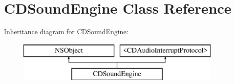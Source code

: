 \hypertarget{interface_c_d_sound_engine}{\section{C\-D\-Sound\-Engine Class Reference}
\label{interface_c_d_sound_engine}
}
Inheritance diagram for C\-D\-Sound\-Engine\-:\begin{figure}[H]
\begin{center}
\leavevmode
\includegraphics[height=2.000000cm]{interface_c_d_sound_engine}
\end{center}
\end{figure}
